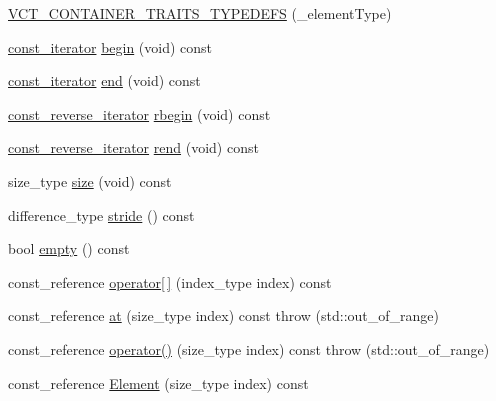 \begin{DoxyCompactItemize}
\item 
\hyperlink{classvct_dynamic_const_vector_base_a63aca3a525a4e0586f6d2605a043da30}{V\-C\-T\-\_\-\-C\-O\-N\-T\-A\-I\-N\-E\-R\-\_\-\-T\-R\-A\-I\-T\-S\-\_\-\-T\-Y\-P\-E\-D\-E\-F\-S} (\-\_\-element\-Type)
\item 
\hyperlink{classvct_dynamic_const_vector_base_ad04d1e54698ac5e244d15dfacd0e603c}{const\-\_\-iterator} \hyperlink{classvct_dynamic_const_vector_base_a381043489a635413066ab6ac56a69992}{begin} (void) const 
\item 
\hyperlink{classvct_dynamic_const_vector_base_ad04d1e54698ac5e244d15dfacd0e603c}{const\-\_\-iterator} \hyperlink{classvct_dynamic_const_vector_base_aeaa7a44c2f37bf702e558ca3c4dae8b2}{end} (void) const 
\item 
\hyperlink{classvct_dynamic_const_vector_base_aadfcc99550b376238b6c793c17d19ca5}{const\-\_\-reverse\-\_\-iterator} \hyperlink{classvct_dynamic_const_vector_base_acf50b72382ed9d6f5ae52de5871205ea}{rbegin} (void) const 
\item 
\hyperlink{classvct_dynamic_const_vector_base_aadfcc99550b376238b6c793c17d19ca5}{const\-\_\-reverse\-\_\-iterator} \hyperlink{classvct_dynamic_const_vector_base_ac572c37dbea0db58f5a88d8ac9e16dca}{rend} (void) const 
\item 
size\-\_\-type \hyperlink{classvct_dynamic_const_vector_base_a79950d8cced7fd4e790d9ac2ca1c43a7}{size} (void) const 
\item 
difference\-\_\-type \hyperlink{classvct_dynamic_const_vector_base_af0440ce847480b353e9f85edccc03158}{stride} () const 
\item 
bool \hyperlink{classvct_dynamic_const_vector_base_a79da2d2783768d927f1181e2d593fba6}{empty} () const 
\item 
const\-\_\-reference \hyperlink{classvct_dynamic_const_vector_base_a17cef202525ee1a77c004d1f53876777}{operator\mbox{[}$\,$\mbox{]}} (index\-\_\-type index) const 
\item 
const\-\_\-reference \hyperlink{classvct_dynamic_const_vector_base_a80200034ab8246259be4dfb8decc7e50}{at} (size\-\_\-type index) const   throw (std\-::out\-\_\-of\-\_\-range)
\item 
const\-\_\-reference \hyperlink{classvct_dynamic_const_vector_base_a0bc74c2f59ce479b9ea2a2175afbc1cd}{operator()} (size\-\_\-type index) const   throw (std\-::out\-\_\-of\-\_\-range)
\item 
const\-\_\-reference \hyperlink{classvct_dynamic_const_vector_base_a0adf25034263fc4587ef5d118019eb6a}{Element} (size\-\_\-type index) const 

\end{DoxyCompactItemize}
